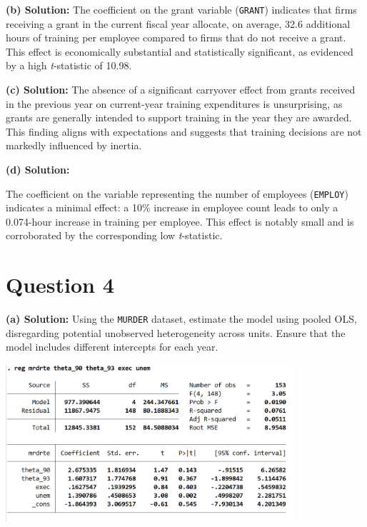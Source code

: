 \documentclass{article}
\begin{document}
\textbf{(b) Solution:}
The coefficient on the grant variable (\texttt{GRANT}) indicates that firms receiving a grant in the current fiscal year allocate, on average, 32.6 additional hours of training per employee compared to firms that do not receive a grant. This effect is economically substantial and statistically significant, as evidenced by a high \textit{t}-statistic of 10.98.

\textbf{(c) Solution:}
The absence of a significant carryover effect from grants received in the previous year on current-year training expenditures is unsurprising, as grants are generally intended to support training in the year they are awarded. This finding aligns with expectations and suggests that training decisions are not markedly influenced by inertia.

\textbf{(d) Solution:}

The coefficient on the variable representing the number of employees (\texttt{EMPLOY}) indicates a minimal effect: a 10\% increase in employee count leads to only a 0.074-hour increase in training per employee. This effect is notably small and is corroborated by the corresponding low \textit{t}-statistic.

\section{Question 4}
\textbf{(a) Solution:}
Using the \texttt{MURDER} dataset, estimate the model using pooled OLS, disregarding potential unobserved heterogeneity across units. Ensure that the model includes different intercepts for each year.

\begin{center}
    
    \includegraphics[width=0.8\textwidth]{HW4/P4-1.jpg}
    
\end{center}
\end{document}
